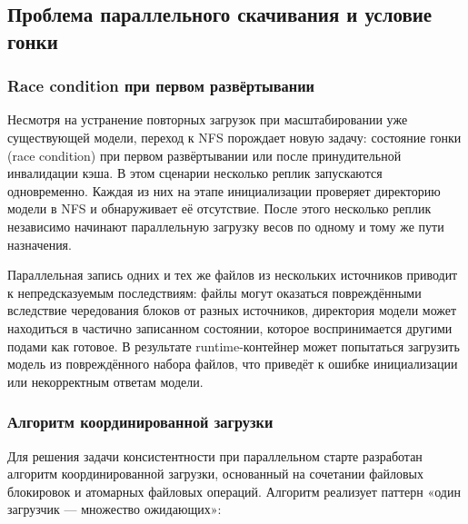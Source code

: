 \subsection{Проблема параллельного скачивания и условие гонки}

\subsubsection*{Race condition при первом развёртывании}

Несмотря на устранение повторных загрузок при масштабировании уже существующей модели, переход к NFS порождает новую задачу: состояние гонки (race condition) при первом развёртывании или после принудительной инвалидации кэша. В этом сценарии несколько реплик запускаются одновременно. Каждая из них на этапе инициализации проверяет директорию модели в NFS и обнаруживает её отсутствие. После этого несколько реплик независимо начинают параллельную загрузку весов по одному и тому же пути назначения.

Параллельная запись одних и тех же файлов из нескольких источников приводит к непредсказуемым последствиям: файлы могут оказаться повреждёнными вследствие чередования блоков от разных источников, директория модели может находиться в частично записанном состоянии, которое воспринимается другими подами как готовое. В результате runtime-контейнер может попытаться загрузить модель из повреждённого набора файлов, что приведёт к ошибке инициализации или некорректным ответам модели.

\subsubsection*{Алгоритм координированной загрузки}

Для решения задачи консистентности при параллельном старте разработан алгоритм координированной загрузки, основанный на сочетании файловых блокировок и атомарных файловых операций. Алгоритм реализует паттерн «один загрузчик --- множество ожидающих»:

